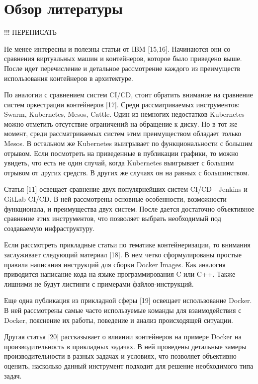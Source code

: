 \section{Обзор литературы}
\label{sec:lit-rev}

!!! ПЕРЕПИСАТЬ

Не менее интересны и полезны статьи от IBM [15,16]. Начинаются они со сравнения виртуальных машин и контейнеров, которое было приведено выше. После идет перечисление и детальное рассмотрение каждого из преимуществ использования контейнеров в архитектуре.

По аналогии с сравнением систем CI/CD, стоит обратить внимание на сравнение систем оркестрации контейнеров [17]. Среди рассматриваемых инструментов: Swarm, Kubernetes, Mesos, Cattle. Один из немногих недостатков Kubernetes можно отметить отсутствие ограничений на обращение к диску. Но в тот же момент, среди рассматриваемых систем этим преимуществом обладает только Mesos. В остальном же Kubernetes выигрывает по функциональности с большим отрывом. Если посмотреть на приведенные в публикации графики, то можно увидеть, что есть не один случай, когда Kubernetes выигрывает с большим отрывом от других средств. В других же случаях он на равных с большинством.

Статья [11] освещает сравнение двух популярнейших систем CI/CD - Jenkins и GitLab CI/CD. В ней рассмотрены основные особенности, возможности функционала, и преимущества двух систем. После дается достаточно объективное сравнение этих инструментов, что позволяет выбрать необходимый под создаваемую инфраструктуру.

Если рассмотреть прикладные статьи по тематике контейнеризации, то внимания заслуживает следующий материал [18]. В нем четко сформулированы простые правила написания инструкций для сборки Docker Images. Как аналогия приводится написание кода на языке программирования C или C++. Также лишними не будут листинги с примерами файлов-инструкций.

Еще одна публикация из прикладной сферы [19] освещает использование Docker. В ней рассмотрены самые часто используемые команды для взаимодействия с Docker, пояснение их работы, поведение и анализ происходящей ситуации.

Другая статья [20] рассказывает о влиянии контейнеров на примере Docker на производительность в прикладных задачах. В ней проведены детальные замеры производительности в разных задачах и условиях, что позволяет объективно оценить, насколько данный инструмент подходит для решение необходимого типа задач.

